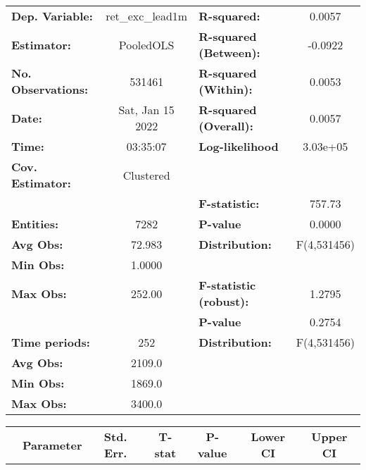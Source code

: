 \begin{center}
\begin{tabular}{lclc}
\toprule
\textbf{Dep. Variable:}    &  ret\_exc\_lead1m  & \textbf{  R-squared:         }   &      0.0057      \\
\textbf{Estimator:}        &     PooledOLS      & \textbf{  R-squared (Between):}  &     -0.0922      \\
\textbf{No. Observations:} &       531461       & \textbf{  R-squared (Within):}   &      0.0053      \\
\textbf{Date:}             &  Sat, Jan 15 2022  & \textbf{  R-squared (Overall):}  &      0.0057      \\
\textbf{Time:}             &      03:35:07      & \textbf{  Log-likelihood     }   &     3.03e+05     \\
\textbf{Cov. Estimator:}   &     Clustered      & \textbf{                     }   &                  \\
\textbf{}                  &                    & \textbf{  F-statistic:       }   &      757.73      \\
\textbf{Entities:}         &        7282        & \textbf{  P-value            }   &      0.0000      \\
\textbf{Avg Obs:}          &       72.983       & \textbf{  Distribution:      }   &   F(4,531456)    \\
\textbf{Min Obs:}          &       1.0000       & \textbf{                     }   &                  \\
\textbf{Max Obs:}          &       252.00       & \textbf{  F-statistic (robust):} &      1.2795      \\
\textbf{}                  &                    & \textbf{  P-value            }   &      0.2754      \\
\textbf{Time periods:}     &        252         & \textbf{  Distribution:      }   &   F(4,531456)    \\
\textbf{Avg Obs:}          &       2109.0       & \textbf{                     }   &                  \\
\textbf{Min Obs:}          &       1869.0       & \textbf{                     }   &                  \\
\textbf{Max Obs:}          &       3400.0       & \textbf{                     }   &                  \\
\bottomrule
\end{tabular}
\begin{tabular}{lcccccc}
                & \textbf{Parameter} & \textbf{Std. Err.} & \textbf{T-stat} & \textbf{P-value} & \textbf{Lower CI} & \textbf{Upper CI}  \\

\end{tabular}
\end{center}
